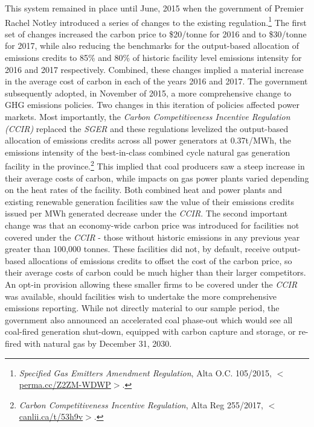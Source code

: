 \documentclass[12pt]{article}
\begin{document}
This system remained in place until June, 2015 when the government of Premier Rachel Notley introduced a series of changes to the existing regulation.\footnote{\textit{Specified Gas Emitters Amendment Regulation}, Alta O.C. 105/2015, $<$\url{perma.cc/Z2ZM-WDWP}$>$.} The first set of changes increased the carbon price to \$20/tonne for 2016 and to \$30/tonne for 2017, while also reducing the benchmarks for the output-based allocation of emissions credits to 85\% and 80\% of historic facility level emissions intensity for 2016 and 2017 respectively. Combined, these changes implied a material increase in the average cost of carbon in each of the years 2016 and 2017. The government subsequently adopted, in November of 2015, a more comprehensive change to GHG emissions policies. Two changes in this iteration of policies affected power markets.  Most importantly, the \textit{Carbon Competitiveness Incentive Regulation (CCIR)} replaced the \emph{SGER} and these regulations levelized the output-based allocation of emissions credits across all power generators at 0.37t/MWh, the emissions intensity of the best-in-class combined cycle natural gas generation facility in the province.\footnote{\textit{Carbon Competitiveness Incentive Regulation}, Alta Reg 255/2017, $<$\url{canlii.ca/t/53h9v}$>$.} This implied that coal producers saw a steep increase in their average costs of carbon, while impacts on gas power plants varied depending on the heat rates of the facility. Both combined heat and power plants and existing renewable generation facilities saw the value of their emissions credits issued per MWh generated decrease under the \emph{CCIR}. The second important change was that an economy-wide carbon price was introduced for facilities not covered under the \emph{CCIR} - those without historic emissions in any previous year greater than 100,000 tonnes. These facilities did not, by default, receive output-based allocations of emissions credits to offset the cost of the carbon price, so their average costs of carbon could be much higher than their larger competitors.  An opt-in provision allowing these smaller firms to be covered under the \emph{CCIR} was available, should facilities wish to undertake the more comprehensive emissions reporting. While not directly material to our sample period, the government also announced an accelerated coal phase-out which would see all coal-fired generation shut-down, equipped with carbon capture and storage, or re-fired with natural gas by December 31, 2030.
\end{document}
